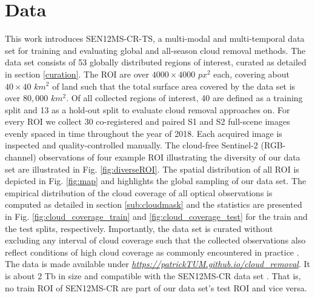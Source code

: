 \documentclass[journal]{IEEEtran}
\begin{document}
\section{Data} \label{data}

This work introduces SEN12MS-CR-TS, a multi-modal and multi-temporal data set for training and evaluating global and all-season cloud removal methods. The data set consists of 53 globally distributed regions of interest, curated as detailed in section  \ref{curation}. The ROI are over $4000 \times 4000$ $px^2$ each, covering about $40 \times 40$ $km^2$ of land such that the total surface area covered by the data set is over $80,000$ $km^2$. Of all collected regions of interest, 40 are defined as a training split and 13 as a hold-out split to evaluate cloud removal approaches on. For every ROI we collect 30 co-registered and paired S1 and S2 full-scene images evenly spaced in time throughout the year of 2018. Each acquired image is inspected and quality-controlled manually. The cloud-free Sentinel-2 (RGB-channel) observations of four example ROI illustrating the diversity of our data set are illustrated in Fig. \ref{fig:diverseROI}. The spatial distribution of all ROI is depicted in Fig. \ref{fig:map} and highlights the global sampling of our data set. The empirical distribution of the cloud coverage of all optical observations is computed as detailed in section \ref{sub:cloudmask} and the statistics are presented in Fig. \ref{fig:cloud_coverage_train} and \ref{fig:cloud_coverage_test} for the train and the test splits, respectively. Importantly, the data set is curated without excluding any interval of cloud coverage such that the collected observations also reflect conditions of high cloud coverage as commonly encountered in practice \cite{King_Platnick_Menzel_Ackerman_Hubanks_2013}. The data is made available under \textit{\url{https://patrickTUM.github.io/cloud_removal}}. It is about 2 Tb in size and compatible with the SEN12MS-CR data set \cite{ebel2020multisensor}. That is, no train ROI of SEN12MS-CR are part of our data set's test ROI and vice versa.
\end{document}
